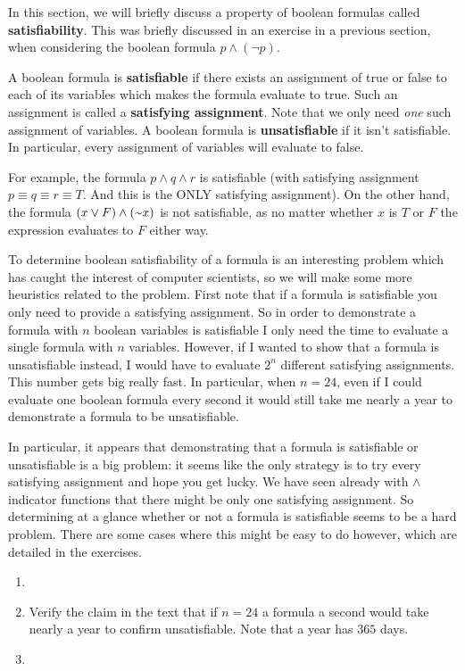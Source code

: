 In this section, we will briefly discuss a property of boolean formulas called \textbf{satisfiability}. This was briefly discussed in an exercise in a previous section, when considering the boolean formula $p \land (\lnot p)$.

\begin{tcolorbox}
 A boolean formula is \textbf{satisfiable} if there exists an assignment of true or false to each of its variables which makes the formula evaluate to true. Such an assignment is called a \textbf{satisfying assignment}. Note that we only need \textit{one} such assignment of variables.
 A boolean formula is \textbf{unsatisfiable} if it isn't satisfiable. In particular, every assignment of variables will evaluate to false.
\end{tcolorbox}

For example, the formula $p \land q \land r$ is satisfiable (with satisfying assignment $p \equiv q \equiv r \equiv T$. And this is the ONLY satisfying assignment). On the other hand, the formula $(x \lor F) \land (\shortsim x)$ is not satisfiable, as no matter whether $x$ is $T$ or $F$ the expression evaluates to $F$ either way.

To determine boolean satisfiability of a formula is an interesting problem which has caught the interest of computer scientists, so we will make some more heuristics related to the problem. First note that if a formula is satisfiable you only need to provide a satisfying assignment. So in order to demonstrate a formula with $n$ boolean variables is satisfiable I only need the time to evaluate a single formula with $n$ variables. However, if I wanted to show that a formula is unsatisfiable instead, I would have to evaluate $2^n$ different satisfying assignments. This number gets big really fast. In particular, when $n = 24$, even if I could evaluate one boolean formula every second it would still take me nearly a year to demonstrate a formula to be unsatisfiable.

In particular, it appears that demonstrating that a formula is satisfiable or unsatisfiable is a big problem: it seems like the only strategy is to try every satisfying assignment and hope you get lucky. We have seen already with $\land$ indicator functions that there might be only one satisfying assignment. So determining at a glance whether or not a formula is satisfiable seems to be a hard problem. There are some cases where this might be easy to do however, which are detailed in the exercises.
 \begin{enumerate}
   \item 
   \item Verify the claim in the text that if $n = 24$ a formula a second would take nearly a year to confirm unsatisfiable. Note that a year has $365$ days.
   \item 
 \end{enumerate}